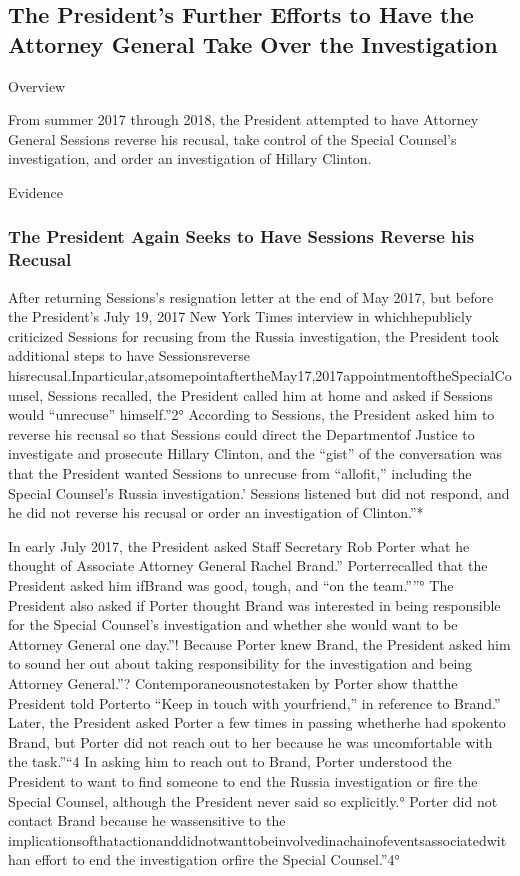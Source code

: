 \subsection{The President’s Further Efforts to Have the Attorney General Take Over the Investigation}

Overview

From summer 2017 through 2018, the President attempted to have Attorney General Sessions reverse his recusal, take control of the Special Counsel’s investigation, and order an investigation of Hillary Clinton.

Evidence

\subsubsection{The President Again Seeks to Have Sessions Reverse his Recusal}

After returning Sessions’s resignation letter at the end of May 2017, but before the President’s July 19, 2017 New York Times interview in whichhepublicly criticized Sessions for recusing from the Russia investigation, the President took additional steps to have Sessionsreverse hisrecusal.Inparticular,atsomepointaftertheMay17,2017appointmentoftheSpecialCounsel, Sessions recalled, the President called him at home and asked if Sessions would “unrecuse” himself.”2° According to Sessions, the President asked him to reverse his recusal so that Sessions could direct the Departmentof Justice to investigate and prosecute Hillary Clinton, and the “gist” of the conversation was that the President wanted Sessions to unrecuse from “allofit,” including the Special Counsel’s Russia investigation.’ Sessions listened but did not respond, and he did not reverse his recusal or order an investigation of Clinton.”*

In early July 2017, the President asked Staff Secretary Rob Porter what he thought of Associate Attorney General Rachel Brand.” Porterrecalled that the President asked him ifBrand was good, tough, and “on the team.””° The President also asked if Porter thought Brand was interested in being responsible for the Special Counsel’s investigation and whether she would want to be Attorney General one day.”! Because Porter knew Brand, the President asked him to sound her out about taking responsibility for the investigation and being Attorney General.”? Contemporaneousnotestaken by Porter show thatthe President told Porterto “Keep in touch with yourfriend,” in reference to Brand.” Later, the President asked Porter a few times in passing whetherhe had spokento Brand, but Porter did not reach out to her because he was uncomfortable with the task.”“4 In asking him to reach out to Brand, Porter understood the President to want to find someone to end the Russia investigation or fire the Special Counsel, although the President never said so explicitly.° Porter did not contact Brand because he wassensitive to the implicationsofthatactionanddidnotwanttobeinvolvedinachainofeventsassociatedwithan effort to end the investigation orfire the Special Counsel.”4°

